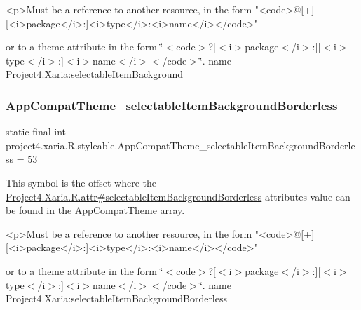 \begin{DoxyVerb}      <p>Must be a reference to another resource, in the form "<code>@[+][<i>package</i>:]<i>type</i>:<i>name</i></code>"
\end{DoxyVerb}
 or to a theme attribute in the form \char`\"{}$<$code$>$?\mbox{[}$<$i$>$package$<$/i$>$\+:\mbox{]}\mbox{[}$<$i$>$type$<$/i$>$\+:\mbox{]}$<$i$>$name$<$/i$>$$<$/code$>$\char`\"{}.  name Project4.\+Xaria\+:selectable\+Item\+Background \mbox{\label{classproject4_1_1xaria_1_1R_1_1styleable_ab2466f3fbbecad455aa1db2f009363f0}} 
\subsubsection{\texorpdfstring{App\+Compat\+Theme\+\_\+selectable\+Item\+Background\+Borderless}{AppCompatTheme\_selectableItemBackgroundBorderless}}
{\footnotesize\ttfamily static final int project4.\+xaria.\+R.\+styleable.\+App\+Compat\+Theme\+\_\+selectable\+Item\+Background\+Borderless = 53\hspace{0.3cm}{\ttfamily [static]}}

This symbol is the offset where the \hyperlink{}{Project4.\+Xaria.\+R.\+attr\#selectable\+Item\+Background\+Borderless} attribute\textquotesingle{}s value can be found in the \hyperlink{classproject4_1_1xaria_1_1R_1_1styleable_aad8bec413e2350f9404e6ff0e831a85d}{App\+Compat\+Theme} array.

\begin{DoxyVerb}      <p>Must be a reference to another resource, in the form "<code>@[+][<i>package</i>:]<i>type</i>:<i>name</i></code>"
\end{DoxyVerb}
 or to a theme attribute in the form \char`\"{}$<$code$>$?\mbox{[}$<$i$>$package$<$/i$>$\+:\mbox{]}\mbox{[}$<$i$>$type$<$/i$>$\+:\mbox{]}$<$i$>$name$<$/i$>$$<$/code$>$\char`\"{}.  name Project4.\+Xaria\+:selectable\+Item\+Background\+Borderless \mbox{\label{classproject4_1_1xaria_1_1R_1_1styleable_afdbe9190461391839d559af54a7397ed}} 
